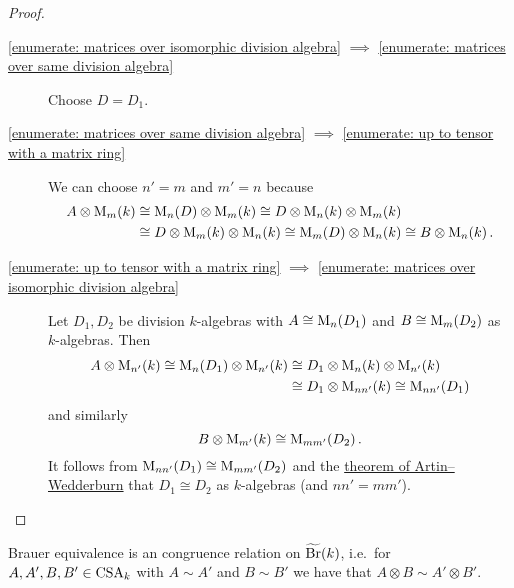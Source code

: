 \begin{proof}
  \leavevmode
  \begin{description}
    \item[\ref*{enumerate: matrices over isomorphic division algebra} $\implies$ \ref*{enumerate: matrices over same division algebra}]
      Choose $D = D_1$.
    \item[\ref*{enumerate: matrices over same division algebra} $\implies$ \ref*{enumerate: up to tensor with a matrix ring}]
      We can choose $n' = m$ and $m' = n$ because
      \begin{align*}
              A \otimes \operatorname{M}_m(k)
        &\cong \operatorname{M}_n(D) \otimes \operatorname{M}_m(k)
         \cong D \otimes \operatorname{M}_n(k) \otimes \operatorname{M}_m(k)  \\
        &\cong D \otimes \operatorname{M}_m(k) \otimes \operatorname{M}_n(k)
         \cong \operatorname{M}_m(D) \otimes \operatorname{M}_n(k)
         \cong B \otimes \operatorname{M}_n(k) \,.
      \end{align*}
    \item[\ref*{enumerate: up to tensor with a matrix ring} $\implies$ \ref*{enumerate: matrices over isomorphic division algebra}]
      Let $D_1, D_2$ be division $k$-algebras with $A \cong \operatorname{M}_n(D_1)$ and $B \cong \operatorname{M}_m(D_2)$ as $k$-algebras.
      Then
      \begin{align*}
                A \otimes \operatorname{M}_{n'}(k)
         \cong  \operatorname{M}_n(D_1) \otimes \operatorname{M}_{n'}(k)
        &\cong  D_1 \otimes \operatorname{M}_n(k) \otimes \operatorname{M}_{n'}(k)  \\
        &\cong  D_1 \otimes \operatorname{M}_{nn'}(k)
         \cong  \operatorname{M}_{nn'}(D_1)
      \end{align*}
      and similarly
      \[
              B \otimes \operatorname{M}_{m'}(k)
        \cong \operatorname{M}_{mm'}(D_2) \,.
      \]
      It follows from $\operatorname{M}_{nn'}(D_1) \cong \operatorname{M}_{mm'}(D_2)$ and the \hyperref[theorem: artin wedderburn theorem]{theorem of Artin--Wedderburn} that $D_1 \cong D_2$ as $k$-algebras (and $nn' = mm'$).
    \qedhere
  \end{description}
\end{proof}


\begin{corollary}
  \label{corollary: Brauer equivalence is a congruence relation}
  Brauer equivalence is an congruence relation on $\widetilde{\operatorname{Br}}(k)$, i.e.\ for $A, A', B, B' \in \operatorname{CSA}_k$ with $A \sim A'$ and $B \sim B'$ we have that $A \otimes B \sim A' \otimes B'$.
\end{corollary}


